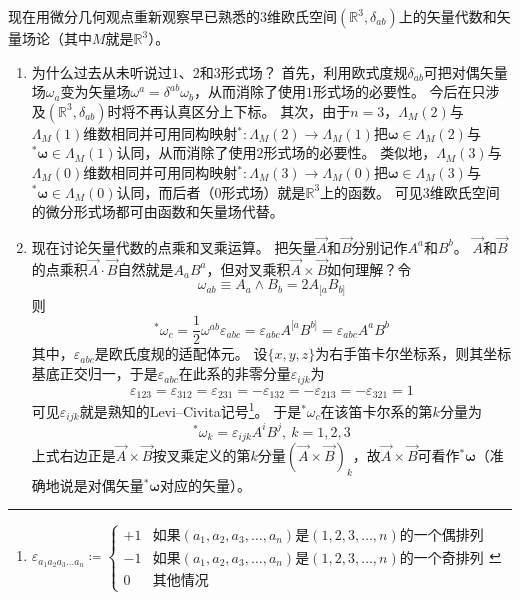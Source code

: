 现在用微分几何观点重新观察早已熟悉的$3$维欧氏空间$(\mathbb{R}^3, \delta_{ab})$上的矢量代数和矢量场论（其中$M$就是$\mathbb{R}^3$）。

\begin{enumerate}[（1）]
    \item 为什么过去从未听说过$1$、$2$和$3$形式场？
    首先，利用欧式度规$\delta_{ab}$可把对偶矢量场$\omega_a$变为矢量场$\omega^a = \delta^{ab}\omega_b$，从而消除了使用$1$形式场的必要性。
    今后在只涉及$(\mathbb{R}^3, \delta_{ab})$时将不再认真区分上下标。
    其次，由于$n = 3$，$\Lambda_M(2)$与$\Lambda_M(1)$维数相同并可用同构映射$^* \colon \Lambda_M(2) \to \Lambda_M(1)$把$\bm\omega \in \Lambda_M(2)$与$^*\bm\omega \in \Lambda_M(1)$认同，从而消除了使用$2$形式场的必要性。
    类似地，$\Lambda_M(3)$与$\Lambda_M(0)$维数相同并可用同构映射$^* \colon \Lambda_M(3) \to \Lambda_M(0)$把$\bm\omega \in \Lambda_M(3)$与$^*\bm\omega \in \Lambda_M(0)$认同，而后者（$0$形式场）就是$\mathbb{R}^3$上的函数。
    可见$3$维欧氏空间的微分形式场都可由函数和矢量场代替。
    \item 现在讨论矢量代数的点乘和叉乘运算。
    把矢量$\vec A$和$\vec B$分别记作$A^a$和$B^b$。
    $\vec A$和$\vec B$的点乘积$\vec A \cdot \vec B$自然就是$A_aB^a$，但对叉乘积$\vec A \times \vec B$如何理解？令
    $$\omega_{ab} \equiv A_a \wedge B_b = 2A_{[a}B_{b]}$$
    则
    $$^*\omega_c = \frac{1}{2}\omega^{ab}\varepsilon_{abc} = \varepsilon_{abc}A^{[a}B^{b]} = \varepsilon_{abc}A^{a}B^{b}$$
    其中，$\varepsilon_{abc}$是欧氏度规的适配体元。
    设$\{x, y, z\}$为右手笛卡尔坐标系，则其坐标基底正交归一，于是$\varepsilon_{abc}$在此系的非零分量$\varepsilon_{ijk}$为
    $$\varepsilon_{123} = \varepsilon_{312} = \varepsilon_{231} = -\varepsilon_{132} = -\varepsilon_{213} = -\varepsilon_{321} = 1$$
    可见$\varepsilon_{ijk}$就是熟知的Levi--Civita记号\footnote{$
        \varepsilon_{a_1 a_2 a_3 \ldots a_n} \coloneq
        \begin{cases}
        +1 & \text{如果}(a_1 , a_2 , a_3 , \ldots , a_n) \text{是} (1,2,3,\dots,n) \text{的一个偶排列}  \\
        -1 & \text{如果}(a_1 , a_2 , a_3 , \ldots , a_n) \text{是} (1,2,3,\dots,n) \text{的一个奇排列} \\
        0 & \text{其他情况}
        \end{cases}
    $}。
    于是$^*\omega_c$在该笛卡尔系的第$k$分量为
    $$^*\omega_k = \varepsilon_{ijk}A^iB^j, ~ k = 1, 2, 3$$
    上式右边正是$\vec A \times \vec B$按叉乘定义的第$k$分量$(\vec A \times \vec B)_k$，故$\vec A \times \vec B$可看作$^*\bm\omega$（准确地说是对偶矢量$^*\bm\omega$对应的矢量）。

\end{enumerate}
